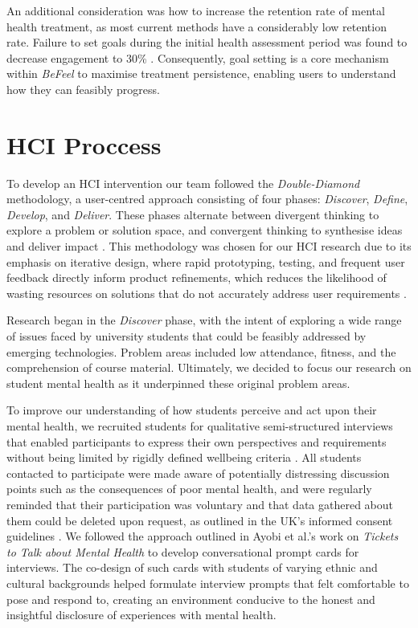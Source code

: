 \documentclass[acmsmall, screen, nonacm, 9pt, a4paper,top=2cm,bottom=2cm,left=1cm,right=1cm, marginparwidth=1cm]{acmart}
\begin{document}
An additional consideration was how to increase the retention rate of mental health treatment, as most current methods have a considerably low retention rate. Failure to set goals during the initial health assessment period was found to decrease engagement to 30\% \cite{Cairns2019GoalAnalysis}. Consequently, goal setting is a core mechanism within \emph{BeFeel} to maximise treatment persistence, enabling users to understand how they can feasibly progress.


\section{HCI Proccess\protect\footnotemark}
To develop an HCI intervention our team followed the \emph{Double-Diamond} methodology, a user-centred approach consisting of four phases: \emph{Discover}, \emph{Define}, \emph{Develop}, and \emph{Deliver}. These phases alternate between divergent thinking to explore a problem or solution space, and convergent thinking to synthesise ideas and deliver impact \cite{Design-CouncilFrameworkCouncil}. This methodology was chosen for our HCI research due to its emphasis on iterative design, where rapid prototyping, testing, and frequent user feedback directly inform product refinements, which reduces the likelihood of wasting resources on solutions that do not accurately address user requirements \cite{DanNessler2018HowCollective}. 

Research began in the \emph{Discover} phase, with the intent of exploring a wide range of issues faced by university students that could be feasibly addressed by emerging technologies. Problem areas included low attendance, fitness, and the comprehension of course material. Ultimately, we decided to focus our research on student mental health as it underpinned these original problem areas.

To improve our understanding of how students perceive and act upon their mental health, we recruited students for qualitative semi-structured interviews that enabled participants to express their own perspectives and requirements without being limited by rigidly defined wellbeing criteria \cite{Palinkas2014QualitativeResearch}. All students contacted to participate were made aware of potentially distressing discussion points such as the consequences of poor mental health, and were regularly reminded that their participation was voluntary and that data gathered about them could be deleted upon request, as outlined in the UK’s informed consent guidelines \cite{GOV.UKGettingGOV.UK}. We followed the approach outlined in Ayobi et al.’s work on \emph{Tickets to Talk about Mental Health} \cite{Ayobi2021DesigningMinorities} to develop conversational prompt cards for interviews. The co-design of such cards with students of varying ethnic and cultural backgrounds helped formulate interview prompts that felt comfortable to pose and respond to, creating an environment conducive to the honest and insightful disclosure of experiences with mental health.
\end{document}
